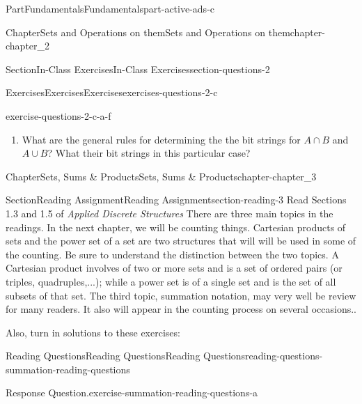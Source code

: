 \documentclass[oneside,10pt,]{book}
\numberwithin{equation}{section}
\begin{document}
\begin{partptx}{Part}{Fundamentals}{}{Fundamentals}{}{}{part-active-ads-c}
\begin{chapterptx}{Chapter}{Sets and Operations on them}{}{Sets and Operations on them}{}{}{chapter-chapter_2}
\begin{sectionptx}{Section}{In-Class Exercises}{}{In-Class Exercises}{}{}{section-questions-2}
\begin{exercises-subsection-numberless}{Exercises}{Exercises}{}{Exercises}{}{}{exercises-questions-2-c}
\begin{exercisegroup}
\begin{divisionexerciseeg}{6}{}{}{exercise-questions-2-c-a-f}
\begin{enumerate}[label=(\alph*)]
\item{}What are the general rules for determining the the bit strings for \(A\cap B\) and \(A \cup B\)?  What their bit strings in this particular case?%
\end{enumerate}
%
\end{divisionexerciseeg}%
\end{exercisegroup}
\par\medskip\noindent
\end{exercises-subsection-numberless}
\end{sectionptx}
\end{chapterptx}
%
\typeout{************************************************}
\typeout{************************************************}
%
\begin{chapterptx}{Chapter}{Sets, Sums \& Products}{}{Sets, Sums \& Products}{}{}{chapter-chapter_3}
\renewcommand*{\chaptername}{Chapter}
%
%
%
%
%
\typeout{************************************************}
\typeout{************************************************}
%
\begin{sectionptx}{Section}{Reading Assignment}{}{Reading Assignment}{}{}{section-reading-3}
Read Sections 1.3 and 1.5 of \emph{Applied Discrete Structures} There are three main topics in the readings.  In the next chapter, we will be counting things.  Cartesian products of sets and the power set of a set are two structures that will will be used in some of the counting.  Be sure to understand the distinction between the two topics.  A Cartesian product involves of two or more sets and is a set of ordered pairs (or triples, quadruples,...); while a power set is of a single set and is the set of all subsets of that set.    The third topic, summation notation, may very well be review for many readers. It also will appear in the counting process on several occasions..%
\par
Also, turn in solutions to these exercises:%
%
%
\typeout{************************************************}
\typeout{************************************************}
%
\begin{reading-questions-subsection-numberless}{Reading Questions}{Reading Questions}{}{Reading Questions}{}{}{reading-questions-summation-reading-questions}
\begin{divisionexercise}{1}{Response Question.}{}{exercise-summation-reading-questions-a}%

\end{divisionexercise}
\end{reading-questions-subsection-numberless}
\end{sectionptx}
\end{chapterptx}
\end{partptx}
\end{document}
